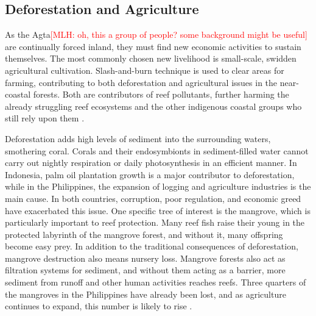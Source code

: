\documentclass{book}\usepackage{knitr}
\newcommand{\red}[1]{\textcolor{red}{[MLH: #1]}}
\begin{document}
{\subsection{Deforestation and Agriculture}

As the Agta\red{oh, this a group of people?  some background might be useful} are continually forced inland, they must find new economic activities to sustain themselves. The most commonly chosen new livelihood is small-scale, swidden agricultural cultivation. Slash-and-burn technique is used to clear areas for farming, contributing to both deforestation and agricultural issues in the near-coastal forests. Both are contributors of reef pollutants, further harming the already struggling reef ecosystems and the other indigenous coastal groups who still rely upon them \citep{RePEc:gam:jsusta:v:12:y:2020:i:19:p:7983-:d:420111}.

Deforestation adds high levels of sediment into the surrounding waters, smothering coral. Corals and their endosymbionts in sediment-filled water cannot carry out nightly respiration or daily photosynthesis in an efficient manner. In Indonesia, palm oil plantation growth is a major contributor to deforestation, while in the Philippines, the expansion of logging and agriculture industries is the main cause. In both countries, corruption, poor regulation, and economic greed have exacerbated this issue. One specific tree of interest is the mangrove, which is particularly important to reef protection. Many reef fish raise their young in the protected labyrinth of the mangrove forest, and without it, many offspring become easy prey. In addition to the traditional consequences of deforestation, mangrove destruction also means nursery loss. Mangrove forests also act as filtration systems for sediment, and without them acting as a barrier, more sediment from runoff and other human activities reaches reefs. Three quarters of the mangroves in the Philippines have already been lost, and as agriculture continues to expand, this number is likely to rise \citep{coralreefalliance_2021}.

}
\end{document}
